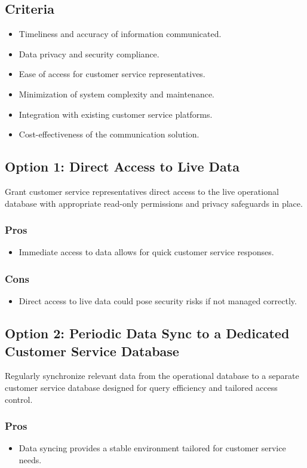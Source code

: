 \subsection*{Criteria}
\begin{itemize}
    \item Timeliness and accuracy of information communicated.
    \item Data privacy and security compliance.
    \item Ease of access for customer service representatives.
    \item Minimization of system complexity and maintenance.
    \item Integration with existing customer service platforms.
    \item Cost-effectiveness of the communication solution.
\end{itemize}

\subsection*{Option 1: Direct Access to Live Data}
Grant customer service representatives direct access to the live operational database with appropriate read-only permissions and privacy safeguards in place.
\subsubsection*{Pros}
\begin{itemize}
    \item Immediate access to data allows for quick customer service responses.
\end{itemize}
\subsubsection*{Cons}
\begin{itemize}
    \item Direct access to live data could pose security risks if not managed correctly.
\end{itemize}

\subsection*{Option 2: Periodic Data Sync to a Dedicated Customer Service Database}
Regularly synchronize relevant data from the operational database to a separate customer service database designed for query efficiency and tailored access control.
\subsubsection*{Pros}
\begin{itemize}
    \item Data syncing provides a stable environment tailored for customer service needs.
\end{itemize}
